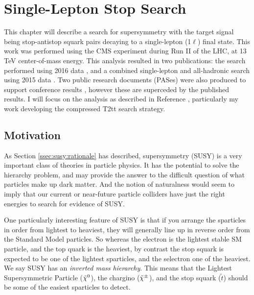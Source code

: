 \chapter{Single-Lepton Stop Search}
\label{chap:stop}

This chapter will describe a search for supersymmetry with the target signal
being stop-antistop squark pairs decaying to a single-lepton (1$\ell$)
final state. This work was performed using the CMS experiment during
Run II of the LHC, at 13 TeV center-of-mass energy. This analysis
resulted in two publications: the search performed using 2016 data \cite{stop1l},
and a combined single-lepton and all-hadronic search using 2015 data
\cite{combination0l}. Two public research documents (PASes) were
also produced to support conference results \cite{pasichep,pasmoriond},
however these are superceded by the published results. I will focus on
the analysis as described in Reference \cite{stop1l}, particularly my work
developing the compressed T2tt search strategy.

\section{Motivation}
\label{sec:stop:motivation}

As Section \ref{ssec:susy:rationale} has described, supersymmetry
(SUSY) is a very important class of theories in particle physics. It
has the potential to solve the hierarchy problem, and may provide the
answer to the difficult question of what particles make up dark
matter. And the notion of naturalness would seem to imply that our
current or near-future particle colliders have just the right energies
to search for evidence of SUSY.

One particularly interesting feature of SUSY is that if you arrange
the sparticles in order from lightest to heaviest, they will generally line up
in reverse order from the Standard Model particles. So whereas the
electron is the lightest stable SM particle, and the top quark is the
heaviest, by contrast the stop squark is expected to be one of the lightest
sparticles, and the selectron one of the heaviest. We say SUSY has an
\emph{inverted mass hierarchy}. %
This means that the Lightest Supersymmetric Particle ($\tilde{\chi}^0$), the
chargino ($\tilde{\chi}^\pm$), and the stop squark ($\tilde{t}$) should be
some of the easiest sparticles to detect.

